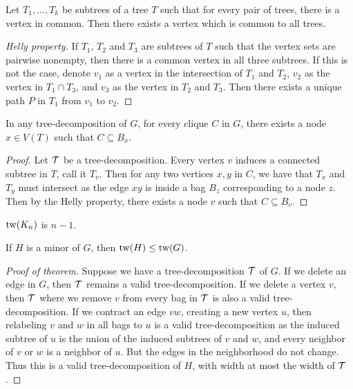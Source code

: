 \begin{lemma}\label{lem:Helly}
	Let $T_1, ..., T_k$ be subtrees of a tree $T$ such that for every pair of trees, there is a vertex in common. Then there exists a vertex which is common to all trees.
\end{lemma}
\begin{proof}[Helly property]
	If $T_1$, $T_2$ and $T_3$ are subtrees of $T$ such that the vertex sets are pairwise nonempty, then there is a common vertex in all three subtrees. If this is not the case, denote $v_1$ as a vertex in the intersection of $T_1$ and $T_2$, $v_2$ as the vertex in $T_1 \cap T_3$, and $v_3$ as the vertex in $T_2$ and $T_3$. Then there exists a unique path $P$ in $T_1$ from $v_1$ to $v_2$.
\end{proof}

\begin{theorem}\label{thm:clique}
	In any tree-decomposition of $G$, for every clique $C$ in $G$, there exists a node $x \in V(T)$ such that $C \subseteq B_x$. 
\end{theorem}

\begin{proof}
	Let $\mathcal{T}$ be a tree-decomposition. Every vertex $v$ induces a connected subtree in $T$, call it $T_v$. Then for any two vertices $x, y$ in $C$, we have that $T_x$ and $T_y$ must intersect as the edge $xy$ is inside a bag $B_z$ corresponding to a node $z$. Then by the Helly property, there exists a node $v$ such that $C \subseteq B_v$.
\end{proof}

\begin{corollary}\label{cor:complete_tw}
	$\text{tw}(K_n)$ is $n-1$. 
\end{corollary}

\begin{theorem}\label{thm:tw_minor_closure}
	If $H$ is a minor of $G$, then $\text{tw}(H) \leq \text{tw}(G)$. 
\end{theorem}
\begin{proof}[Proof of theorem]
	Suppose we have a tree-decomposition $\mathcal{T}$ of $G$. If we delete an edge in $G$, then $\mathcal{T}$ remains a valid tree-decomposition. If we delete a vertex $v$, then $\mathcal{T}$ where we remove $v$ from every bag in $\mathcal{T}$ is also a valid tree-decomposition. If we contract an edge $vw$, creating a new vertex $u$, then relabeling $v$ and $w$ in all bags to $u$ is a valid tree-decomposition as the induced subtree of $u$ is the union of the induced subtrees of $v$ and $w$, and every neighbor of $v$ or $w$ is a neighbor of $u$. But the edges in the neighborhood do not change. Thus this is a valid tree-decomposition of $H$, with width at most the width of $\mathcal{T}$.
\end{proof}

